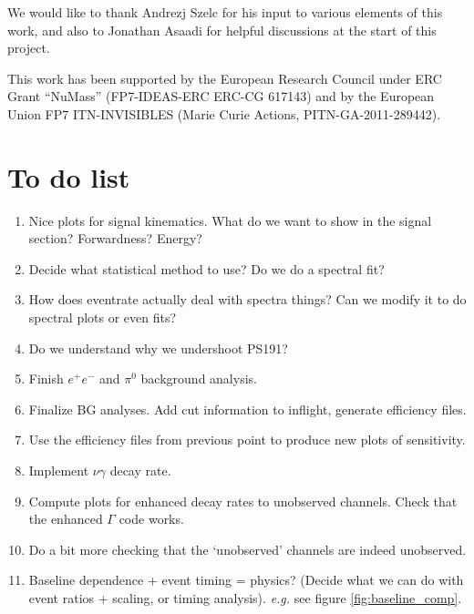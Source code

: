 \documentclass[11pt, a4paper]{article}
\begin{document}
\acknowledgments

We would like to thank Andrezj Szelc for his input to various elements of this
work, and also to Jonathan Asaadi for helpful discussions at the start of this
project.

This work has been supported by the European Research Council under ERC Grant
“NuMass” (FP7-IDEAS-ERC ERC-CG 617143) and by the European Union FP7
ITN-INVISIBLES (Marie Curie Actions, PITN-GA-2011-289442).

\appendix

\section{To do list}

\begin{enumerate}

\item Nice plots for signal kinematics. What do we want to show in the signal
section? Forwardness? Energy? 

\item Decide what statistical method to use? Do we do a spectral fit?

\item How does eventrate actually deal with spectra things? Can we modify it to 
do spectral plots or even fits?

\item Do we understand why we undershoot PS191?

\item Finish $e^+e^-$ and $\pi^0$ background analysis.

\item Finalize BG analyses. Add cut information to inflight, generate
efficiency files. 

\item Use the efficiency files from previous point to produce new plots of
sensitivity.

\item Implement $\nu\gamma$ decay rate. 

\item Compute plots for enhanced decay rates to unobserved channels. Check that
the enhanced $\Gamma$ code works.

\item Do a bit more checking that the `unobserved' channels are indeed unobserved.

\item Baseline dependence + event timing = physics? (Decide what we can do with
event ratios + scaling, or timing analysis).  \emph{e.g.} see figure
\ref{fig:baseline_comp}.


\end{enumerate}
\end{document}
